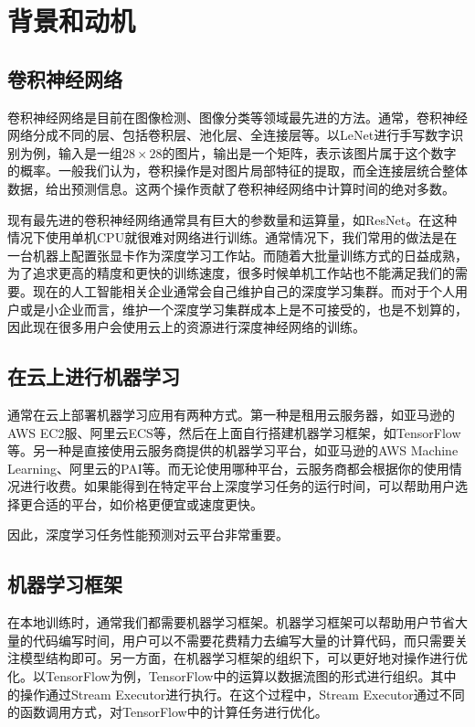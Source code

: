\chapter{背景和动机}
\label{cha:back}

\section{卷积神经网络}
    卷积神经网络是目前在图像检测、图像分类等领域最先进的方法\cite{mcdnn, yolo}。通常，卷积神经网络分成不同的层、包括卷积层、池化层、全连接层等。以LeNet\cite{lenet}进行手写数字识别为例，输入是一组$ 28 \times 28 $的图片，输出是一个矩阵，表示该图片属于这个数字的概率。一般我们认为，卷积操作是对图片局部特征的提取，而全连接层统合整体数据，给出预测信息。这两个操作贡献了卷积神经网络中计算时间的绝对多数。
    
    现有最先进的卷积神经网络通常具有巨大的参数量和运算量，如ResNet\cite{resnet}。在这种情况下使用单机CPU就很难对网络进行训练。通常情况下，我们常用的做法是在一台机器上配置张显卡作为深度学习工作站。而随着大批量训练方式的日益成熟\cite{bigbatch}，为了追求更高的精度和更快的训练速度，很多时候单机工作站也不能满足我们的需要。现在的人工智能相关企业通常会自己维护自己的深度学习集群。而对于个人用户或是小企业而言，维护一个深度学习集群成本上是不可接受的，也是不划算的，因此现在很多用户会使用云上的资源进行深度神经网络的训练。

\section{在云上进行机器学习}
    通常在云上部署机器学习应用有两种方式。第一种是租用云服务器，如亚马逊的AWS EC2服、阿里云ECS等，然后在上面自行搭建机器学习框架，如TensorFlow等。另一种是直接使用云服务商提供的机器学习平台，如亚马逊的AWS Machine Learning、阿里云的PAI等。而无论使用哪种平台，云服务商都会根据你的使用情况进行收费。如果能得到在特定平台上深度学习任务的运行时间，可以帮助用户选择更合适的平台，如价格更便宜或速度更快。
    
    因此，深度学习任务性能预测对云平台非常重要。
    
\section{机器学习框架}
    在本地训练时，通常我们都需要机器学习框架。机器学习框架可以帮助用户节省大量的代码编写时间，用户可以不需要花费精力去编写大量的计算代码，而只需要关注模型结构即可。另一方面，在机器学习框架的组织下，可以更好地对操作进行优化。以TensorFlow为例，TensorFlow中的运算以数据流图的形式进行组织。其中的操作通过Stream Executor进行执行。在这个过程中，Stream Executor通过不同的函数调用方式，对TensorFlow中的计算任务进行优化。
    
